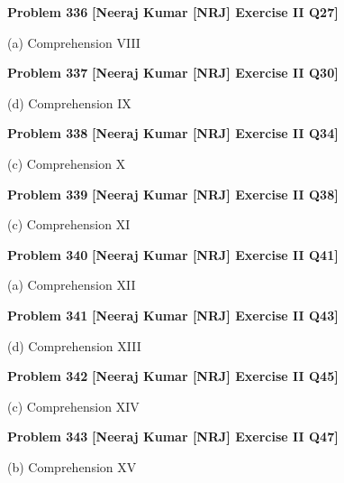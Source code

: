 \begin{problembox}
\textbf{Problem 336} \hfill \textbf{[Neeraj Kumar [NRJ] Exercise II Q27]}
\label{q:ext-nrj_all_questions-336}

(a)
Comprehension VIII
\end{problembox}

\begin{problembox}
\textbf{Problem 337} \hfill \textbf{[Neeraj Kumar [NRJ] Exercise II Q30]}
\label{q:ext-nrj_all_questions-337}

(d)
Comprehension IX
\end{problembox}

\begin{problembox}
\textbf{Problem 338} \hfill \textbf{[Neeraj Kumar [NRJ] Exercise II Q34]}
\label{q:ext-nrj_all_questions-338}

(c)
Comprehension X
\end{problembox}

\begin{problembox}
\textbf{Problem 339} \hfill \textbf{[Neeraj Kumar [NRJ] Exercise II Q38]}
\label{q:ext-nrj_all_questions-339}

(c)
Comprehension XI
\end{problembox}

\begin{problembox}
\textbf{Problem 340} \hfill \textbf{[Neeraj Kumar [NRJ] Exercise II Q41]}
\label{q:ext-nrj_all_questions-340}

(a)
Comprehension XII
\end{problembox}

\begin{problembox}
\textbf{Problem 341} \hfill \textbf{[Neeraj Kumar [NRJ] Exercise II Q43]}
\label{q:ext-nrj_all_questions-341}

(d)
Comprehension XIII
\end{problembox}

\begin{problembox}
\textbf{Problem 342} \hfill \textbf{[Neeraj Kumar [NRJ] Exercise II Q45]}
\label{q:ext-nrj_all_questions-342}

(c)
Comprehension XIV
\end{problembox}

\begin{problembox}
\textbf{Problem 343} \hfill \textbf{[Neeraj Kumar [NRJ] Exercise II Q47]}
\label{q:ext-nrj_all_questions-343}

(b)
Comprehension XV
\end{problembox}

